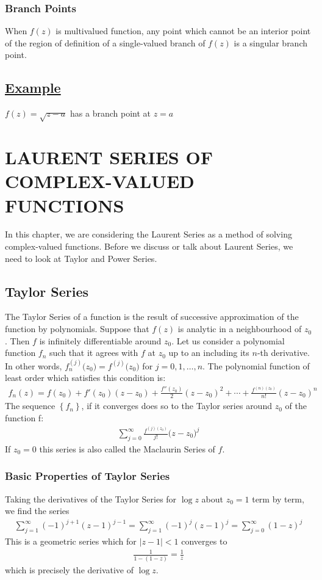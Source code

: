 \documentclass[11pt]{report}
\newcommand{\ubt}[1]{\textbf{\underline{#1}}}
\newcommand{\sprime}{'}
\newcommand{\dprime}{''}
\newcommand{\dsp}{\displaystyle}
\newcommand{\example}[1]{\section*{\ubt{Example #1}}}
\begin{document}
	\subsection{Branch Points}
	When $f(z)$ is multivalued function, any point which cannot be an interior point of the region of definition of a single-valued branch of $f(z)$ is a singular branch point.
	\example{}
	$\dsp f(z)=\sqrt{z-a}$ has a branch point at $z=a$


	\chapter{LAURENT SERIES OF COMPLEX-VALUED FUNCTIONS}
	In this chapter, we are considering the Laurent Series as a method of solving complex-valued functions. Before we discuss or talk about Laurent Series, we need to look at Taylor and Power Series.
	
	\section{Taylor Series}
	The Taylor Series of a function is the result of successive approximation of the function by polynomials. Suppose that $f(z)$ is analytic in a neighbourhood of $z_0$. Then $f$ is infinitely differentiable around $z_0$. Let us consider a polynomial function $f_n$ such that it agrees with $f$ at $z_0$ up to an including its $n$-th derivative. In other words, $f_n^{(j)}\Big(z_0\Big)=f^{(j)}\Big(z_0\Big)$ for $j=0,1,\ldots,n$. The polynomial function of least order which satisfies this condition is:
	\begin{eqnarray}
		f_n(z) = f(z_0) + f\sprime(z_0)(z-z_0)+\frac{f\dprime(z_0)}{2}(z-z_0)^2 + \cdots + \frac{f^{(n)(z_0)}}{n!}(z-z_0)^n
	\end{eqnarray}
	The sequence $\left\{f_n\right\}$, if it converges does so to the Taylor series around $z_0$ of the function f:
	\begin{eqnarray}
		\sum_{j=0}^{\infty}\frac{f^{(j)(z_0)}}{j!}\Big(z-z_0\Big)^j
	\end{eqnarray}
	If $z_0=0$ this series is also called the Maclaurin Series of $f$.
	
	\subsection{Basic Properties of Taylor Series}
	Taking the derivatives of the Taylor Series for $\log z$ about $z_0=1$ term by term, we find the series
	\begin{eqnarray}
		\sum_{j=1}^{\infty}(-1)^{j+1}(z-1)^{j-1} = \sum_{j=1}^{\infty}(-1)^j(z-1)^j = \sum_{j=0}^{\infty}(1-z)^j
	\end{eqnarray} 
	This is a geometric series which for $|z-1|< 1$ converges to
	\begin{eqnarray}
		\frac{1}{1-(1-z)} = \frac{1}{z}
	\end{eqnarray}
	which is precisely the derivative of $\log z$.
	
\end{document}
